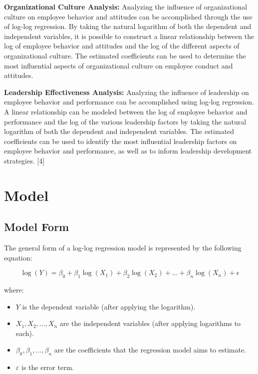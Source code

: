 \documentclass[
  letterpaper,
  DIV=11,
  numbers=noendperiod]{scrreport}
\begin{document}
\textbf{Organizational Culture Analysis:} Analyzing the influence of
organizational culture on employee behavior and attitudes can be
accomplished through the use of log-log regression. By taking the
natural logarithm of both the dependent and independent variables, it is
possible to construct a linear relationship between the log of employee
behavior and attitudes and the log of the different aspects of
organizational culture. The estimated coefficients can be used to
determine the most influential aspects of organizational culture on
employee conduct and attitudes.

\textbf{Leadership Effectiveness Analysis:} Analyzing the influence of
leadership on employee behavior and performance can be accomplished
using log-log regression. A linear relationship can be modeled between
the log of employee behavior and performance and the log of the various
leadership factors by taking the natural logarithm of both the dependent
and independent variables. The estimated coefficients can be used to
identify the most influential leadership factors on employee behavior
and performance, as well as to inform leadership development strategies.
{[}4{]}

\section{Model}\label{model}

\subsection{Model Form}\label{model-form}

The general form of a log-log regression model is represented by the
following equation:

\begin{equation}
\log(Y) = \beta_0 + \beta_1\log(X_1) + \beta_2\log(X_2) + ... + \beta_n\log(X_n) + \epsilon
\end{equation}

where:

\begin{itemize}
\item
  \(Y\) is the dependent variable (after applying the logarithm).
\item
  \(X_1, X_2, ..., X_n\) are the independent variables (after applying
  logarithms to each).
\item
  \(β_0, β_1, ..., β_n\) are the coefficients that the regression model
  aims to estimate.
\item
  \(ε\) is the error term.
\end{itemize}
\end{document}
